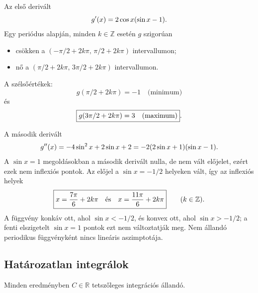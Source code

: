 \documentclass{szb-solution}
\begin{document}
Az első derivált
$$
  g'(x)=2\cos x(\sin x-1)
  \text.
$$
Egy periódus alapján, minden $k\in\mathbb Z$ esetén $g$ szigorúan
\begin{itemize}
  \item csökken a
        $(-\pi/2+2k\pi,\,\pi/2+2k\pi)$ intervallumon;
  \item nő a
        $(\pi/2+2k\pi,\,3\pi/2+2k\pi)$ intervallumon.
\end{itemize}
A szélsőértékek:
$$
  \boxed{g(\pi/2+2k\pi)=-1\quad\text{(minimum)}}
$$
és
$$
  \boxed{g(3\pi/2+2k\pi)=3\quad\text{(maximum)}}
  \text.
$$

A második derivált
$$
  g''(x)=-4\sin^2x+2\sin x+2
        =-2(2\sin x+1)(\sin x-1)
  \text.
$$
A $\sin x=1$ megoldásokban a második derivált nulla, de nem vált előjelet,
ezért ezek nem inflexiós pontok. Az előjel a $\sin x=-1/2$ helyeken vált,
így az inflexiós helyek
$$
  \boxed{x=\frac{7\pi}{6}+2k\pi
  \quad\text{és}\quad
  x=\frac{11\pi}{6}+2k\pi}
  \qquad(k\in\mathbb Z)
  \text.
$$
A függvény konkáv ott, ahol $\sin x<-1/2$, és konvex ott, ahol
$\sin x>-1/2$; a fenti elszigetelt $\sin x=1$ pontok ezt nem változtatják
meg. Nem állandó periodikus függvényként nincs lineáris aszimptotája.

\subsection{Határozatlan integrálok}

Minden eredményben $C\in\mathbb R$ tetszőleges integrációs állandó.
\end{document}
